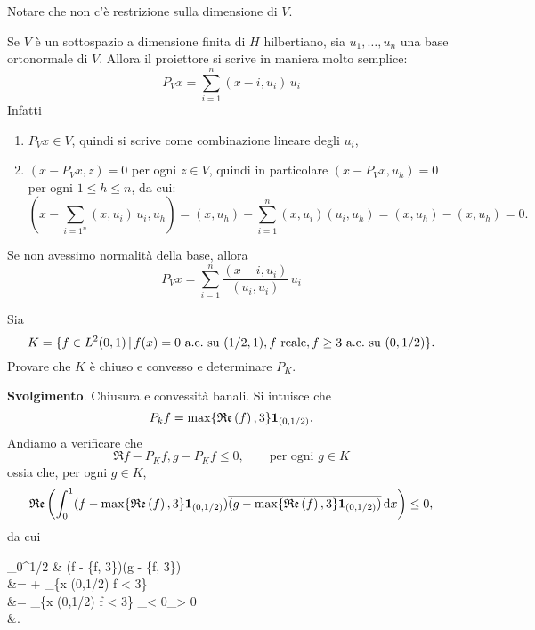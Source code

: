 \begin{remark}
	Notare che non c'è restrizione sulla dimensione di $V$.
\end{remark}

\begin{remark}
	Se $V$ è un sottospazio a dimensione finita di $H$ hilbertiano, sia $u_1, \ldots, u_n$ una base ortonormale di $V$. Allora il proiettore si scrive in maniera molto semplice:
	\begin{equation*}
		P_V x = \sum_{i=1}^n (x-i, u_i)\,u_i
	\end{equation*}
	Infatti
	\begin{enumerate}
		\item $P_V x \in V$, quindi si scrive come combinazione lineare degli $u_i$,
		\item $(x-P_V x, z) = 0$ per ogni $z \in V$, quindi in particolare $(x-P_V x, u_h) = 0$ per ogni $1 \leq h \leq n$, da cui:
		\begin{equation*}
			(x- {\textstyle \sum_{i=1^n}} (x,u_i)\,u_i, u_h) = (x, u_h) - \sum_{i=1}^n (x,u_i)(u_i, u_h) = (x,u_h) - (x, u_h) = 0.
		\end{equation*}
	\end{enumerate}
	Se non avessimo normalità della base, allora
	\begin{equation*}
		P_V x = \sum_{i=1}^n \frac{(x-i, u_i)}{(u_i, u_i)}\,u_i
	\end{equation*}
\end{remark}

\begin{exercise}
	Sia
	\begin{equation*}
		K = \{f \in L^2(0,1) \,|\, f(x) = 0 \ \text{a.e.}\ \text{su $(1/2,1)$}, \text{$f$ reale}, f\geq 3 \ \text{a.e.}\ \text{su $(0,1/2)$}\}.
	\end{equation*}
	Provare che $K$ è chiuso e convesso e determinare $P_K$.

	\textbf{Svolgimento}.
	Chiusura e convessità banali. Si intuisce che
	\begin{equation*}
		P_k f = \max\{\mathfrak{Re}\left(f\right), 3\}{\boldsymbol{1}}_{(0,1/2)}.
	\end{equation*}
	Andiamo a verificare che
	\begin{equation*}
		\Re{f-P_K f, g - P_K f} \leq 0, \qquad \text{per ogni $g \in K$}
	\end{equation*}
	ossia che, per ogni $g \in K$,
	\begin{equation*}
		\mathfrak{Re}\left(\int_0^1 (f- \max\{\mathfrak{Re}\left(f\right), 3\}{\boldsymbol{1}}_{(0,1/2)}) \overline{(g- \max\{\mathfrak{Re}\left(f\right), 3\}{\boldsymbol{1}}_{(0,1/2)})}\,\mathrm{d} x\right) \leq 0,
	\end{equation*}
	da cui
	\begin{eqalign*}
		\int_0^{1/2} & (\Re f - \max \{\Re f, 3\})(g - \max\{\Re f, 3\})\,\dx\\
		&=  + \int_{\{x \in (0,1/2) \suchthat \Re f < 3\}} \\
		&= \int_{\{x \in (0,1/2) \suchthat \Re f < 3\}} _{< 0}_{> 0}\,\dx\\
		&.
	\end{eqalign*}
\end{exercise}
\vspace{1ex}

